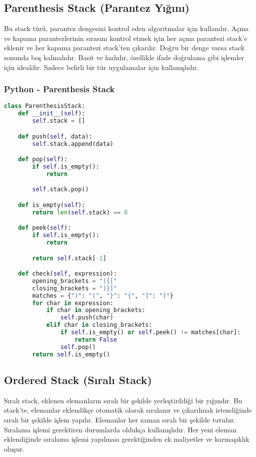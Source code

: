 \newpage

\subsection{Parenthesis Stack (Parantez Yığını)}

Bu stack türü, parantez dengesini kontrol eden algoritmalar için kullanılır. Açma ve kapama parantezlerinin sırasını kontrol etmek için her açma parantezi stack’e eklenir ve her kapama parantezi stack’ten çıkarılır. Doğru bir denge varsa stack sonunda boş kalmalıdır. Basit ve hızlıdır, özellikle ifade doğrulama gibi işlemler için idealdir. Sadece belirli bir tür uygulamalar için kullanışlıdır.

\subsubsection{Python - Parenthesis Stack}

\begin{lstlisting}[language=Python]
class ParenthesisStack:
    def __init__(self):
        self.stack = []

    def push(self, data):
        self.stack.append(data)

    def pop(self):
        if self.is_empty():
            return

        self.stack.pop()

    def is_empty(self):
        return len(self.stack) == 0

    def peek(self):
        if self.is_empty():
            return

        return self.stack[-1]

    def check(self, expression):
        opening_brackets = "({["
        closing_brackets = ")}]"
        matches = {")": "(", "}": "{", "]": "["}
        for char in expression:
            if char in opening_brackets:
                self.push(char)
            elif char in closing_brackets:
                if self.is_empty() or self.peek() != matches[char]:
                    return False
                self.pop()
        return self.is_empty()
\end{lstlisting}

\newpage

\subsection{Ordered Stack (Sıralı Stack)}

Sıralı stack, eklenen elemanların sıralı bir şekilde yerleştirildiği bir yığındır. Bu stack’te, elemanlar eklendikçe otomatik olarak sıralanır ve çıkarılmak istendiğinde sıralı bir şekilde işlem yapılır. Elemanlar her zaman sıralı bir şekilde tutulur. Sıralama işlemi gerektiren durumlarda oldukça kullanışlıdır. Her yeni eleman eklendiğinde sıralama işlemi yapılması gerektiğinden ek maliyetler ve karmaşıklık oluşur.

